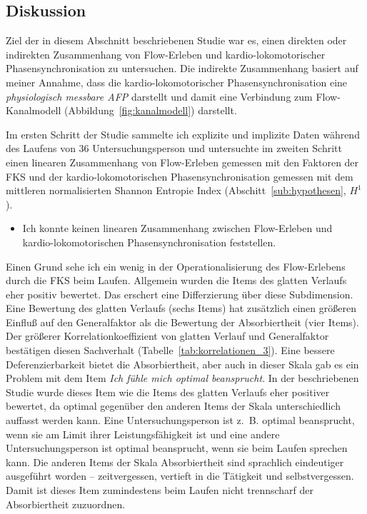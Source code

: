 \subsection{Diskussion} 

\label{sub:diskussion_5_3}

Ziel der in diesem Abschnitt beschriebenen Studie war es, einen direkten oder indirekten Zusammenhang von Flow-Erleben und kardio-lokomotorischer Phasensynchronisation zu untersuchen. Die indirekte Zusammenhang basiert auf meiner Annahme, dass die kardio-lokomotorischer Phasensynchronisation eine \emph{physiologisch messbare \ac{AFP}} darstellt und damit eine Verbindung zum Flow-Kanalmodell (Abbildung~\ref{fig:kanalmodell}) darstellt. 

Im ersten Schritt der Studie sammelte ich explizite und implizite Daten während des Laufens von 36 Untersuchungsperson und untersuchte im zweiten Schritt einen linearen Zusammenhang von Flow-Erleben gemessen mit den Faktoren der \ac{FKS} und der kardio-lokomotorischen Phasensynchronisation gemessen mit dem mittleren normalisierten Shannon Entropie Index (Abschitt~\ref{sub:hypothesen}, $H^1$). 

\begin{itemize}

	\item Ich konnte keinen linearen Zusammenhang zwischen Flow-Erleben und kardio-lokomotorischen Phasensynchronisation feststellen.

\end{itemize}


Einen Grund sehe ich ein wenig in der Operationalisierung des Flow-Erlebens durch die \ac{FKS} beim Laufen. Allgemein wurden die Items des glatten Verlaufs eher positiv bewertet. Das erschert eine Differzierung über diese Subdimension. Eine Bewertung des glatten Verlaufs (sechs Items) hat zusätzlich einen größeren Einfluß auf den Generalfaktor als die Bewertung der Absorbiertheit (vier Items). Der größerer Korrelationkoeffizient von glatten Verlauf und Generalfaktor bestätigen diesen Sachverhalt (Tabelle~\ref{tab:korrelationen_3}). Eine bessere Deferenzierbarkeit bietet die Absorbiertheit, aber auch in dieser Skala gab es ein Problem mit dem Item \emph{Ich fühle mich optimal beansprucht}. In der beschriebenen Studie wurde dieses Item wie die Items des glatten Verlaufs eher positiver bewertet, da optimal gegenüber den anderen Items der Skala unterschiedlich auffasst werden kann. Eine Untersuchungsperson ist z.~B. optimal beansprucht, wenn sie am Limit ihrer Leistungsfähigkeit ist und eine andere Untersuchungsperson ist optimal beansprucht, wenn sie beim Laufen sprechen kann. Die anderen Items der Skala Absorbiertheit sind sprachlich eindeutiger ausgeführt worden -- zeitvergessen, vertieft in die Tätigkeit und selbstvergessen. Damit ist dieses Item zumindestens beim Laufen nicht trennscharf der Absorbiertheit zuzuordnen. 
 
